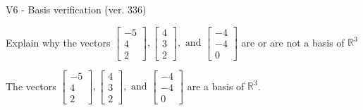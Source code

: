 \begin{exercise}
  \begin{exerciseTitle}V6 - Basis verification (ver. 336)\end{exerciseTitle}
  \begin{exerciseStatement}
    Explain why the vectors \(\left[\begin{array}{r}
-5 \\
4 \\
2
\end{array}\right] , \left[\begin{array}{r}
4 \\
3 \\
2
\end{array}\right] , \text{ and } \left[\begin{array}{r}
-4 \\
-4 \\
0
\end{array}\right]\) are or are not a basis of \(\mathbb{R}^3\)	


  \end{exerciseStatement}
  \begin{exerciseAnswer}
   The vectors \(\left[\begin{array}{r}
-5 \\
4 \\
2
\end{array}\right] , \left[\begin{array}{r}
4 \\
3 \\
2
\end{array}\right] , \text{ and } \left[\begin{array}{r}
-4 \\
-4 \\
0
\end{array}\right]\) 
  	 are  a basis of \(\mathbb{R}^3\).
  


  \end{exerciseAnswer}
\end{exercise}